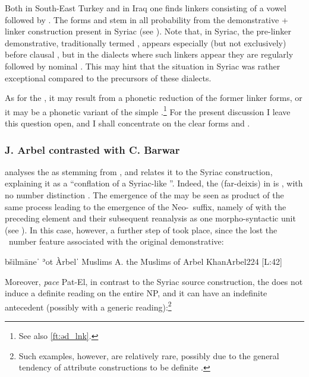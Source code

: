 Both in South-East Turkey and in Iraq one finds linkers consisting of a vowel followed by . The forms  and  stem in all probability from the demonstrative + linker construction present in Syriac (see ). Note that, in Syriac, the pre-linker demonstrative, traditionally termed , appears especially (but not exclusively) before clausal \secns, but in the  dialects where such linkers appear they are regularly followed by nominal \secns. This may hint that the situation in Syriac was rather exceptional compared to the precursors of these  dialects. 


 As for the \lnk* {}, it may  result from a phonetic reduction of the former linker forms, or it may be a phonetic variant of the simple \lnk* {}.\footnote{See also \vref{ft:əd_lnk}.} For the present discussion I leave this question open, and I shall concentrate on the clear forms  and .

\subsubsection{J. Arbel contrasted with C. Barwar} \label{ss:Arb_Barw_lnks}

\citet[224]{KhanArbel} analyses the \Arb \lnk* {} as stemming from , and \citet[67]{PatElCorrelative} relates it to the Syriac construction, explaining it as a \enquote{conflation of a Syriac-like }. Indeed, the \sg* (far-deixis) \dem* in \Arb is , with no number distinction \citep[85]{KhanArbel}. The emergence of the \lnk* {} may be seen as product of the same process leading to the emergence of the Neo-\cst\ \ed suffix, namely  of \d with the preceding element and their subsequent reanalysis as one morpho-syntactic unit (see ). In this case, however, a further step of  took place, since the  \lnk* lost the \sg\ number feature associated with the original demonstrative:

{bšilmāneˈ ʾot\cb{} Àrbelˈ}
{Muslims \lnk\cb{} A.}
{the Muslims of Arbel}
{KhanArbel}{224 {[L:42]}}

Moreover, \textit{pace} Pat-El, in contrast to the Syriac source construction, the  \lnk* does not induce a definite reading on the entire NP, and it can have an indefinite antecedent (possibly with a generic reading):\footnote{Such examples, however, are relatively rare, possibly due to the general tendency of attribute constructions to be definite \citep{HaspelmathArticle}.}

